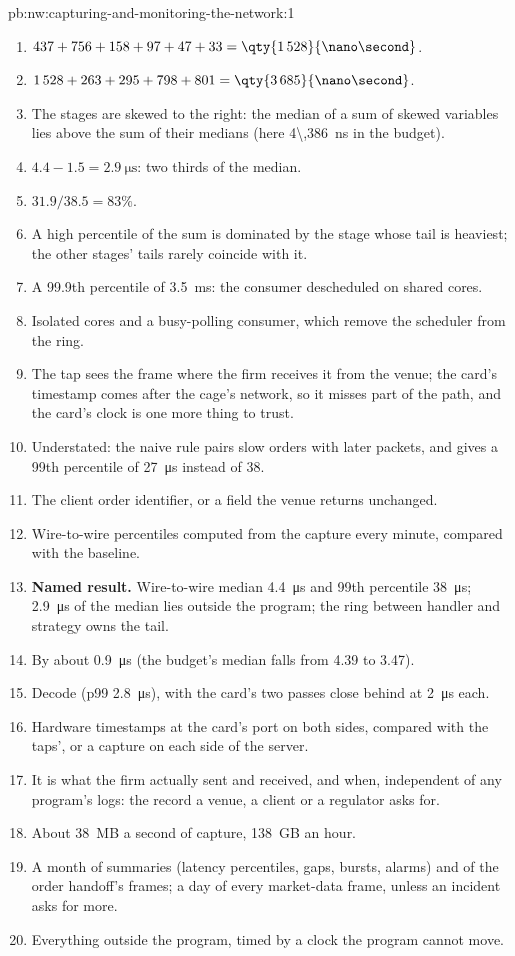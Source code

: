 \begin{solution}{pb:nw:capturing-and-monitoring-the-network:1}
\begin{enumerate}
\item $437 + 756 + 158 + 97 + 47 + 33 = \qty{1\,528}{\nano\second}$.
\item $1\,528 + 263 + 295 + 798 + 801 = \qty{3\,685}{\nano\second}$.
\item The stages are skewed to the right: the median of a sum of skewed variables lies above the sum of their medians (here
  \qty{4\,386}{\nano\second} in the budget).
\item $4.4 - 1.5 = \qty{2.9}{\micro\second}$: two thirds of the median.
\item $31.9 / 38.5 = 83\%$.
\item A high percentile of the sum is dominated by the stage whose tail is heaviest; the other stages' tails rarely coincide with it.
\item A 99.9th percentile of \qty{3.5}{\milli\second}: the consumer descheduled on shared cores.
\item Isolated cores and a busy-polling consumer, which remove the scheduler from the ring.
\item The tap sees the frame where the firm receives it from the venue; the card's timestamp comes after the cage's network, so it misses
  part of the path, and the card's clock is one more thing to trust.
\item Understated: the naive rule pairs slow orders with later packets, and gives a 99th percentile of \qty{27}{\micro\second} instead of 38.
\item The client order identifier, or a field the venue returns unchanged.
\item Wire-to-wire percentiles computed from the capture every minute, compared with the baseline.
\item \textbf{Named result.} Wire-to-wire median \qty{4.4}{\micro\second} and 99th percentile \qty{38}{\micro\second}; \qty{2.9}{\micro\second} of the
  median lies outside the program; the ring between handler and strategy owns the tail.
\item By about \qty{0.9}{\micro\second} (the budget's median falls from 4.39 to 3.47).
\item Decode (p99 \qty{2.8}{\micro\second}), with the card's two passes close behind at \qty{2}{\micro\second} each.
\item Hardware timestamps at the card's port on both sides, compared with the taps', or a capture on each side of the server.
\item It is what the firm actually sent and received, and when, independent of any program's logs: the record a venue, a client or a
  regulator asks for.
\item About 38~MB a second of capture, 138~GB an hour.
\item A month of summaries (latency percentiles, gaps, bursts, alarms) and of the order handoff's frames; a day of every market-data frame,
  unless an incident asks for more.
\item Everything outside the program, timed by a clock the program cannot move.
\end{enumerate}
\end{solution}
